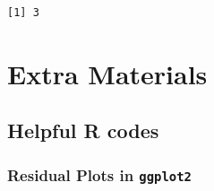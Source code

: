 \documentclass[
]{book}
\begin{document}
\begin{verbatim}
[1] 3
\end{verbatim}

\hypertarget{part-extra-materials}{%
\part*{Extra Materials}\label{part-extra-materials}}

\hypertarget{helpful-r-codes}{%
\chapter{Helpful R codes}\label{helpful-r-codes}}

\hypertarget{residual-plots-in-ggplot2}{%
\section{\texorpdfstring{Residual Plots in \texttt{ggplot2}}{Residual Plots in ggplot2}}\label{residual-plots-in-ggplot2}}
\end{document}
